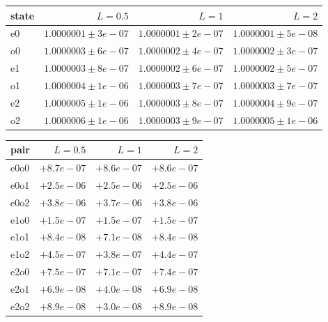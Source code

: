 \begin{tabular}{lrrr}\toprule state & $L=0.5$ & $L=1$ & $L=2$\\\midrule
e0 & $1.0000001\pm3e-07$ & $1.0000001\pm2e-07$ & $1.0000001\pm5e-08$\\
o0 & $1.0000003\pm6e-07$ & $1.0000002\pm4e-07$ & $1.0000002\pm3e-07$\\
e1 & $1.0000003\pm8e-07$ & $1.0000002\pm6e-07$ & $1.0000002\pm5e-07$\\
o1 & $1.0000004\pm1e-06$ & $1.0000003\pm7e-07$ & $1.0000003\pm7e-07$\\
e2 & $1.0000005\pm1e-06$ & $1.0000003\pm8e-07$ & $1.0000004\pm9e-07$\\
o2 & $1.0000006\pm1e-06$ & $1.0000003\pm9e-07$ & $1.0000005\pm1e-06$\\
\bottomrule\end{tabular}
\begin{tabular}{lrrr}\toprule pair & $L=0.5$ & $L=1$ & $L=2$\\\midrule
e0o0 & $+8.7e-07$ & $+8.6e-07$ & $+8.6e-07$\\
e0o1 & $+2.5e-06$ & $+2.5e-06$ & $+2.5e-06$\\
e0o2 & $+3.8e-06$ & $+3.7e-06$ & $+3.8e-06$\\
e1o0 & $+1.5e-07$ & $+1.5e-07$ & $+1.5e-07$\\
e1o1 & $+8.4e-08$ & $+7.1e-08$ & $+8.4e-08$\\
e1o2 & $+4.5e-07$ & $+3.8e-07$ & $+4.4e-07$\\
e2o0 & $+7.5e-07$ & $+7.1e-07$ & $+7.4e-07$\\
e2o1 & $+6.9e-08$ & $+4.0e-08$ & $+6.9e-08$\\
e2o2 & $+8.9e-08$ & $+3.0e-08$ & $+8.9e-08$\\
\bottomrule\end{tabular}
